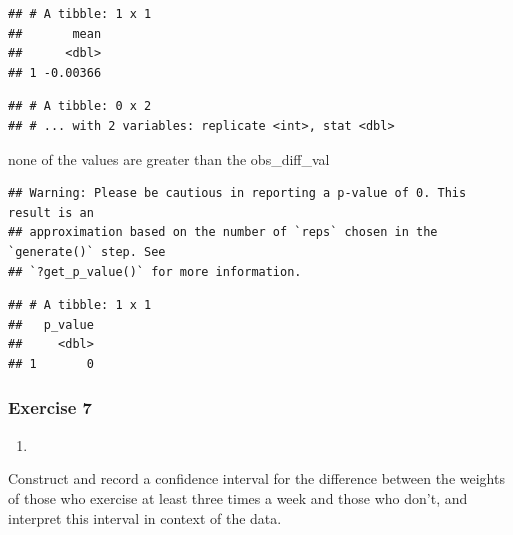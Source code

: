 \documentclass[
]{article}
\newenvironment{Shaded}{\begin{snugshade}}{\end{snugshade}}
\newcommand{\DataTypeTok}[1]{\textcolor[rgb]{0.13,0.29,0.53}{#1}}
\newcommand{\KeywordTok}[1]{\textcolor[rgb]{0.13,0.29,0.53}{\textbf{#1}}}
\newcommand{\NormalTok}[1]{#1}
\newcommand{\OperatorTok}[1]{\textcolor[rgb]{0.81,0.36,0.00}{\textbf{#1}}}
\newcommand{\StringTok}[1]{\textcolor[rgb]{0.31,0.60,0.02}{#1}}
\begin{document}
\begin{verbatim}
## # A tibble: 1 x 1
##       mean
##      <dbl>
## 1 -0.00366
\end{verbatim}

\begin{Shaded}
\end{Shaded}

\begin{verbatim}
## # A tibble: 0 x 2
## # ... with 2 variables: replicate <int>, stat <dbl>
\end{verbatim}

none of the values are greater than the obs\_diff\_val

\begin{Shaded}
\end{Shaded}

\begin{verbatim}
## Warning: Please be cautious in reporting a p-value of 0. This result is an
## approximation based on the number of `reps` chosen in the `generate()` step. See
## `?get_p_value()` for more information.
\end{verbatim}

\begin{verbatim}
## # A tibble: 1 x 1
##   p_value
##     <dbl>
## 1       0
\end{verbatim}

\hypertarget{exercise-7}{%
\subsubsection{Exercise 7}\label{exercise-7}}

\begin{enumerate}
\def\labelenumi{\arabic{enumi}.}
\item
\end{enumerate}

Construct and record a confidence interval for the difference between
the weights of those who exercise at least three times a week and those
who don't, and interpret this interval in context of the data.
\end{document}
